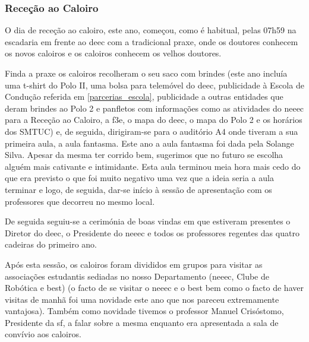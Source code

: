 
\subsubsection{Receção ao Caloiro}

O dia de receção ao caloiro, este ano, começou, como é habitual, pelas 07h59 na escadaria em frente ao \acrshort{deec} com a tradicional praxe, onde os doutores conhecem os novos caloiros e os caloiros conhecem os velhos doutores.

Finda a praxe os caloiros recolheram o seu saco com brindes (este ano incluía uma t-shirt do Polo II, uma bolsa para telemóvel do \acrshort{deec}, publicidade à Escola de Condução referida em \ref{parcerias_escola}, publicidade a outras entidades que deram brindes ao Polo 2 e panfletos com informações como as atividades do \acrshort{neeec} para a Receção ao Caloiro, a \acrshort{f3e}, o mapa do \acrshort{deec}, o mapa do Polo 2 e os horários dos SMTUC) e, de seguida, dirigiram-se para o auditório A4 onde tiveram a sua primeira aula, a aula fantasma. Este ano a aula fantasma foi dada pela Solange Silva. Apesar da mesma ter corrido bem, sugerimos que no futuro se escolha alguém mais cativante e intimidante. Esta aula terminou meia hora mais cedo do que era previsto o que foi muito negativo uma vez que a ideia seria a aula terminar e logo, de seguida, dar-se início à sessão de apresentação com os professores que decorreu no mesmo local.

De seguida seguiu-se a cerimónia de boas vindas em que estiveram presentes o Diretor do \acrshort{deec}, o Presidente do \acrshort{neeec} e todos os professores regentes das quatro cadeiras do primeiro ano.

Após esta sessão, os caloiros foram divididos em grupos para visitar as associações estudantis sediadas no nosso Departamento (\acrshort{neeec}, Clube de Robótica e \acrshort{best}) (o facto de se visitar o \acrshort{neeec} e o \acrshort{best} bem como o facto de haver visitas de manhã foi uma novidade este ano que nos pareceu extremamente vantajosa). Também como novidade tivemos o professor Manuel Crisóstomo, Presidente da \acrfull{sf}, a falar sobre a mesma enquanto era apresentada a sala de convívio aos caloiros.

